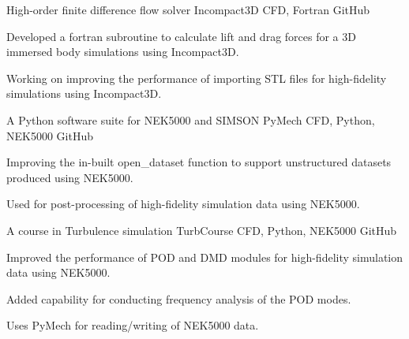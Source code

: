 

\begin{cventries}
  \cventry
  {High-order finite difference flow solver} %
  {Incompact3D} %
  {CFD, Fortran} %
  {GitHub} %
  {
    \begin{cvitems} %
      \item {Developed a fortran subroutine to calculate lift and drag forces for a 3D immersed body simulations using Incompact3D.}
      \item {Working on improving the performance of importing STL files for high-fidelity simulations using Incompact3D.}
    \end{cvitems}
  }

  \cventry
  {A Python software suite for NEK5000 and SIMSON} %
  {PyMech} %
  {CFD, Python, NEK5000} %
  {GitHub} %
  {
    \begin{cvitems} %
      \item {Improving the in-built open\_dataset function to support unstructured datasets produced using NEK5000.}
      \item {Used for post-processing of high-fidelity simulation data using NEK5000.}
    \end{cvitems}
  }

  \cventry
  {A course in Turbulence simulation} %
  {TurbCourse} %
  {CFD, Python, NEK5000} %
  {GitHub} %
  {
    \begin{cvitems} %
      \item {Improved the performance of POD and DMD modules for high-fidelity simulation data using NEK5000.}
      \item {Added capability for conducting frequency analysis of the POD modes.}
      \item {Uses PyMech for reading/writing of NEK5000 data.}
    \end{cvitems}
  }


\end{cventries}
